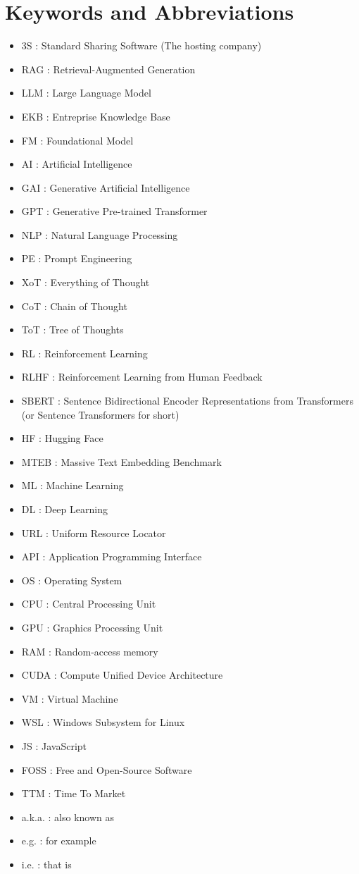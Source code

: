 \chapter*{Keywords and Abbreviations}
\begin{itemize}
    \item 3S : Standard Sharing Software (The hosting company)
    \item RAG : Retrieval-Augmented Generation
    \item LLM : Large Language Model
    \item EKB : Entreprise Knowledge Base
    \item FM : Foundational Model
    \item AI : Artificial Intelligence
    \item GAI : Generative Artificial Intelligence
    \item GPT : Generative Pre-trained Transformer
    \item NLP : Natural Language Processing
    \item PE : Prompt Engineering
    \item XoT : Everything of Thought
    \item CoT : Chain of Thought
    \item ToT : Tree of Thoughts
    \item RL : Reinforcement Learning
    \item RLHF : Reinforcement Learning from Human Feedback
    \item SBERT : Sentence Bidirectional Encoder Representations from Transformers (or Sentence Transformers for short)
    \item HF : Hugging Face
    \item MTEB : Massive Text Embedding Benchmark
    \item ML : Machine Learning
    \item DL : Deep Learning
    \item URL : Uniform Resource Locator
    \item API : Application Programming Interface
    \item OS : Operating System
    \item CPU : Central Processing Unit
    \item GPU : Graphics Processing Unit
    \item RAM : Random-access memory
    \item CUDA : Compute Unified Device Architecture
    \item VM : Virtual Machine
    \item WSL : Windows Subsystem for Linux
    \item JS : JavaScript
    \item FOSS : Free and Open-Source Software
    \item TTM : Time To Market
    \item a.k.a. : also known as
    \item e.g. : for example
    \item i.e. : that is
\end{itemize}